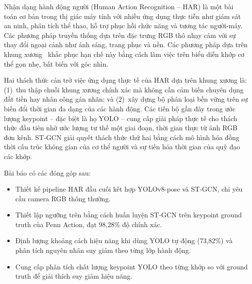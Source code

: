 \documentclass[conference]{IEEEtran}
\begin{document}
Nhận dạng hành động người (Human Action Recognition -- HAR) là một bài toán cơ bản
trong thị giác máy tính với nhiều ứng dụng thực tiễn như giám sát an ninh, phân
tích thể thao, hỗ trợ phục hồi chức năng và tương tác người-máy. Các phương pháp
truyền thống dựa trên đặc trưng RGB thô nhạy cảm với sự thay đổi ngoại cảnh như
ánh sáng, trang phục và nền. Các phương pháp dựa trên khung xương~\cite{yan2018stgcn}
khắc phục hạn chế này bằng cách làm việc trên biểu diễn khớp cơ thể gọn nhẹ,
bất biến với góc nhìn.

Hai thách thức cản trở việc ứng dụng thực tế của HAR dựa trên khung xương là:
(1)~thu thập chuỗi khung xương chính xác mà không cần cảm biến chuyên dụng đắt
tiền hay nhân công gán nhãn; và (2)~xây dựng bộ phân loại bền vững trên sự biến
đổi thời gian đa dạng của các hành động. Các tiến bộ gần đây trong ước lượng
keypoint -- đặc biệt là họ YOLO -- cung cấp giải pháp thực tế cho thách thức đầu
tiên nhờ ước lượng tư thế một giai đoạn, thời gian thực từ ảnh RGB đơn kênh.
ST-GCN giải quyết thách thức thứ hai bằng cách mô hình hóa đồng thời cấu trúc
không gian của cơ thể người và sự tiến hóa thời gian của quỹ đạo các khớp.

Bài báo có các đóng góp sau:
\begin{itemize}
  \item Thiết kế pipeline HAR đầu cuối kết hợp YOLOv8-pose và ST-GCN, chỉ yêu
        cầu camera RGB thông thường.
  \item Thiết lập ngưỡng trên bằng cách huấn luyện ST-GCN trên keypoint ground
        truth của Penn Action, đạt 98,28\% độ chính xác.
  \item Định lượng khoảng cách hiệu năng khi dùng YOLO tự động (73,82\%) và phân
        tích nguyên nhân suy giảm theo từng lớp hành động.
  \item Cung cấp phân tích chất lượng keypoint YOLO theo từng khớp so với ground
        truth để giải thích suy giảm hiệu năng.
\end{itemize}
\end{document}
